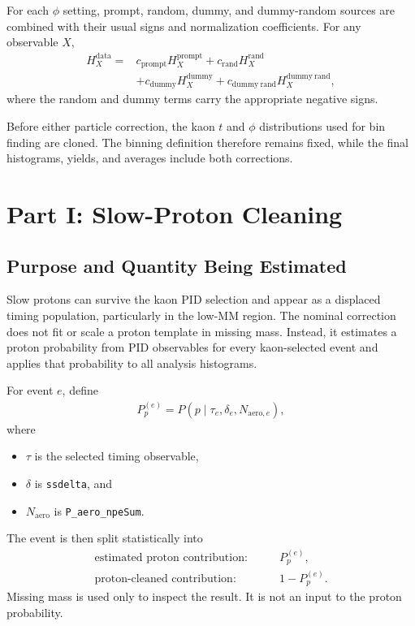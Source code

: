 \documentclass[11pt]{article}
\begin{document}
For each $\phi$ setting, prompt, random, dummy, and dummy-random sources are
combined with their usual signs and normalization coefficients.  For any
observable $X$,
\begin{align}
  H_X^{\mathrm{data}}
  ={}&c_{\mathrm{prompt}}H_X^{\mathrm{prompt}}
     +c_{\mathrm{rand}}H_X^{\mathrm{rand}} \\
    &+c_{\mathrm{dummy}}H_X^{\mathrm{dummy}}
     +c_{\mathrm{dummy\ rand}}H_X^{\mathrm{dummy\ rand}},
\end{align}
where the random and dummy terms carry the appropriate negative signs.

Before either particle correction, the kaon $t$ and $\phi$ distributions used
for bin finding are cloned.  The binning definition therefore remains fixed,
while the final histograms, yields, and averages include both corrections.

\section{Part I: Slow-Proton Cleaning}

\subsection{Purpose and Quantity Being Estimated}

Slow protons can survive the kaon PID selection and appear as a displaced timing
population, particularly in the low-MM region.  The nominal correction does not
fit or scale a proton template in missing mass.  Instead, it estimates a proton
probability from PID observables for every kaon-selected event and applies that
probability to all analysis histograms.

For event $e$, define
\begin{align}
  P_p^{(e)}
  =P\!\left(
      p\mid
      \tau_e,\delta_e,N_{\mathrm{aero},e}
    \right),
\end{align}
where
\begin{itemize}[leftmargin=2em]
  \item $\tau$ is the selected timing observable,
  \item $\delta$ is \texttt{ssdelta}, and
  \item $N_{\mathrm{aero}}$ is \texttt{P\_aero\_npeSum}.
\end{itemize}

The event is then split statistically into
\begin{align}
  \text{estimated proton contribution}:&\qquad P_p^{(e)},\\
  \text{proton-cleaned contribution}:&\qquad 1-P_p^{(e)}.
\end{align}
Missing mass is used only to inspect the result.  It is not an input to the
proton probability.
\end{document}
